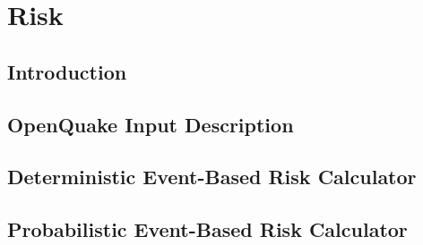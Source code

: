 \documentclass[11pt,a4paper,headings=small,version=first,dvips]{scrbook}
\begin{document}
\part{Risk}
\chapter{Introduction}
	\label{chap:intrisk}
	
\chapter{OpenQuake Input Description}
	\label{chap:riskinput}
	
\chapter{Deterministic Event-Based Risk Calculator}
	\label{chap:risk_deterministic}
	
\chapter{Probabilistic Event-Based Risk Calculator}
	\label{chap:risk_prob_event_based}
	
\end{document}
